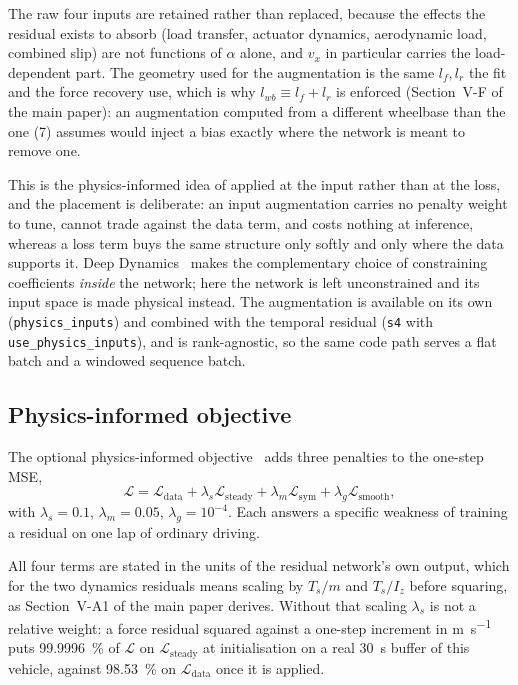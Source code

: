 The raw four inputs are retained rather than replaced, because the effects the
residual exists to absorb (load transfer, actuator dynamics, aerodynamic load,
combined slip) are not functions of $\alpha$ alone, and $v_{x}$ in particular
carries the load-dependent part. The geometry used for the augmentation is the
same $l_{f},l_{r}$ the fit and the force recovery use, which is why
$l_{wb}\equiv l_{f}+l_{r}$ is enforced (Section~V-F of the main paper): an
augmentation computed from a different wheelbase than the one
(7) assumes would inject a bias exactly where the network is
meant to remove one.

This is the physics-informed idea of
\cite{raissi2019pinn,deepdynamics2024} applied at the input rather than at the
loss, and the placement is deliberate: an input augmentation carries no penalty
weight to tune, cannot trade against the data term, and costs nothing at
inference, whereas a loss term buys the same structure only softly and only
where the data supports it. Deep Dynamics~\cite{deepdynamics2024} makes the
complementary choice of constraining coefficients \emph{inside} the network;
here the network is left unconstrained and its input space is made physical
instead. The augmentation is available on its own (\texttt{physics\_inputs})
and combined with the temporal residual (\texttt{s4} with
\texttt{use\_physics\_inputs}), and is rank-agnostic, so the same code path
serves a flat batch and a windowed sequence batch.

\subsection{Physics-informed objective}
\label{sup:pinnloss}
The optional physics-informed
objective~\cite{raissi2019pinn,deepdynamics2024} adds three penalties to the
one-step MSE,
\begin{equation}
\mathcal{L}=\mathcal{L}_{\mathrm{data}}
+\lambda_{s}\mathcal{L}_{\mathrm{steady}}
+\lambda_{m}\mathcal{L}_{\mathrm{sym}}
+\lambda_{g}\mathcal{L}_{\mathrm{smooth}},
\label{eq:pinnloss}
\end{equation}
with $\lambda_{s}=0.1$, $\lambda_{m}=0.05$, $\lambda_{g}=10^{-4}$. Each answers
a specific weakness of training a residual on one lap of ordinary driving.

All four terms are stated in the units of the residual network's own output,
which for the two dynamics residuals means scaling by $T_{s}/m$ and $T_{s}/I_{z}$
before squaring, as Section~V-A1 of the main paper derives. Without that
scaling $\lambda_{s}$ is not a relative weight: a force residual squared
against a one-step increment in \si{\meter\per\second} puts
\SI{99.9996}{\percent} of $\mathcal{L}$ on $\mathcal{L}_{\mathrm{steady}}$ at
initialisation on a real \SI{30}{\second} buffer of this vehicle, against
\SI{98.53}{\percent} on $\mathcal{L}_{\mathrm{data}}$ once it is applied.

